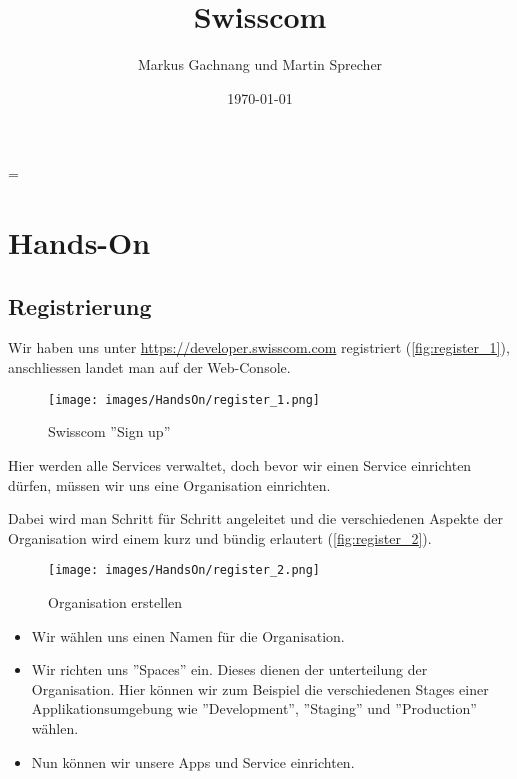 \documentclass[11pt,titlepage]{article}
\title{Swisscom}
\author{Markus Gachnang und Martin Sprecher}
\date{\today{}}
\begin{document}
\sffamily
\maketitle
\newpage
\tableofcontents{}
\setcounter{page}{1}
\newpage
\RaggedRight
\emergencystretch=\maxdimen
{}

\section{Hands-On}
\label{sec:hands-on}

\subsection{Registrierung}
\label{sec:registrierung}

Wir haben uns unter \url{https://developer.swisscom.com} registriert (\autoref{fig:register_1}), anschliessen landet man auf der Web-Console.

\begin{figure}[H]
  \begin{center}
    \texttt{[image: images/HandsOn/register\_1.png]}
    \caption{Swisscom ''Sign up''}
    \label{fig:register_1}
  \end{center}
\end{figure}
Hier werden alle Services verwaltet, doch bevor wir einen Service einrichten dürfen, müssen wir uns eine Organisation einrichten.\par\medskip 
Dabei wird man Schritt für Schritt angeleitet und die verschiedenen Aspekte der Organisation wird einem kurz und bündig erlautert (\autoref{fig:register_2}).
\begin{figure}[H]
  \begin{center}
    \texttt{[image: images/HandsOn/register\_2.png]}
    \caption{Organisation erstellen}
    \label{fig:register_2}
  \end{center}
\end{figure}

\begin{itemize}
    \item Wir wählen uns einen Namen für die Organisation. 
    \item Wir richten uns ''Spaces'' ein. Dieses dienen der unterteilung der Organisation. Hier können wir zum Beispiel die verschiedenen Stages einer Applikationsumgebung wie ''Development'', ''Staging'' und ''Production'' wählen.
    \item Nun können wir unsere Apps und Service einrichten.
\end{itemize}
\end{document}
